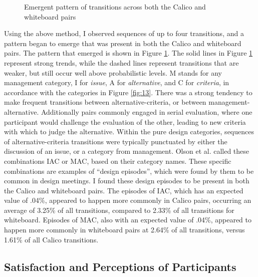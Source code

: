 \begin{figure}
  \centering
\caption{Emergent pattern of transitions across both the Calico and whiteboard pairs}
\label{fig:14}       %
\end{figure}

Using the above method, I observed sequences of up to four transitions, and a pattern began to emerge that was present in both the Calico and whiteboard pairs. The pattern that emerged is shown in Figure \ref{fig:14}. The solid lines in Figure \ref{fig:14} represent strong trends, while the dashed lines represent transitions that are weaker, but still occur well above probabilistic levels. M stands for any management category, I for \emph{issue}, A for \emph{alternative}, and C for \emph{criteria}, in accordance with the categories in Figure \ref{fig:13}. There was a strong tendency to make frequent transitions between alternative-criteria, or between management-alternative. Additionally pairs commonly engaged in serial evaluation, where one participant would challenge the evaluation of the other, leading to new criteria with which to judge the alternative. Within the pure design categories, sequences of alternative-criteria transitions were typically punctuated by either the discussion of an issue, or a category from management. Olson et al. called these combinations IAC or MAC, based on their category names. These specific combinations are examples of ``design episodes'', which were found by them to be common in design meetings. I found these design episodes to be present in both the Calico and whiteboard pairs. The episodes of IAC, which has an expected value of .04\%, appeared to happen more commonly in Calico pairs, occurring an average of 3.25\% of all transitions, compared to 2.33\% of all transitions for whiteboard. Episodes of MAC, also with an expected value of .04\%, appeared to happen more commonly in whiteboard pairs at 2.64\% of all transitions, versus 1.61\% of all Calico transitions. 

\subsection {Satisfaction and Perceptions of Participants}
\label{results:3}

